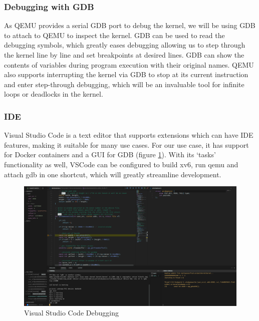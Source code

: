 \subsubsection{Debugging with GDB}
As QEMU provides a serial GDB port to debug the kernel, we will be using GDB to attach to QEMU
to inspect the kernel. GDB can be used to read the debugging symbols, which greatly eases debugging
allowing us to step through the kernel line by line and set breakpoints at desired lines.
GDB can show the contents of variables during program execution with their original
names. QEMU also supports interrupting the kernel via GDB to stop at its current instruction
and enter step-through debugging, which will be an invaluable tool for infinite loops or deadlocks
in the kernel. 
\subsubsection{IDE}
Visual Studio Code \cite{vscode} is a text editor that supports extensions which can have IDE features,
making it suitable for many use cases. For our use case, it has support for Docker containers and
a GUI for GDB (figure \ref{figure:2}). With its `tasks' functionality as well, VSCode can
be configured to build xv6, run qemu and attach gdb in one shortcut, which will greatly
streamline development.

\begin{figure}[H]
    \centering
    \includegraphics[width=15cm]{Screenshot from 2022-04-26 13-05-47.png}
    \caption{Visual Studio Code Debugging}
    \label{figure:2}
\end{figure}


